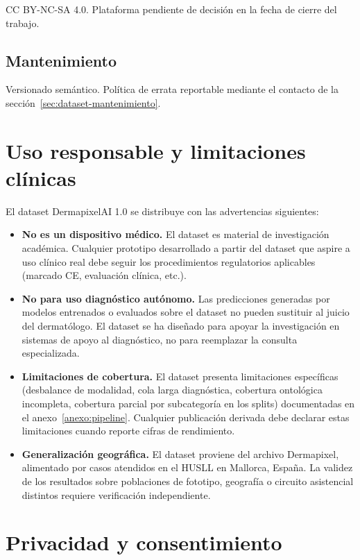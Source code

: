 CC BY-NC-SA 4.0. Plataforma pendiente de decisión en la fecha de
cierre del trabajo.

\subsection*{Mantenimiento}

Versionado semántico. Política de errata reportable mediante el
contacto de la sección~\ref{sec:dataset-mantenimiento}.

\section{Uso responsable y limitaciones clínicas}
\label{sec:dataset-uso-responsable}

El dataset DermapixelAI 1.0 se distribuye con las advertencias
siguientes:

\begin{itemize}
\item \textbf{No es un dispositivo médico.} El dataset es material
de investigación académica. Cualquier prototipo desarrollado a
partir del dataset que aspire a uso clínico real debe seguir los
procedimientos regulatorios aplicables (marcado CE, evaluación
clínica, etc.).

\item \textbf{No para uso diagnóstico autónomo.} Las predicciones
generadas por modelos entrenados o evaluados sobre el dataset no
pueden sustituir al juicio del dermatólogo. El dataset se ha
diseñado para apoyar la investigación en sistemas de apoyo al
diagnóstico, no para reemplazar la consulta especializada.

\item \textbf{Limitaciones de cobertura.} El dataset presenta
limitaciones específicas (desbalance de modalidad, cola larga
diagnóstica, cobertura ontológica incompleta, cobertura parcial
por subcategoría en los splits) documentadas en el
anexo~\ref{anexo:pipeline}. Cualquier publicación derivada debe
declarar estas limitaciones cuando reporte cifras de rendimiento.

\item \textbf{Generalización geográfica.} El dataset proviene del
archivo Dermapixel, alimentado por casos atendidos en el HUSLL en
Mallorca, España. La validez de los resultados sobre poblaciones
de fototipo, geografía o circuito asistencial distintos requiere
verificación independiente.
\end{itemize}

\section{Privacidad y consentimiento}
\label{sec:dataset-privacidad}

